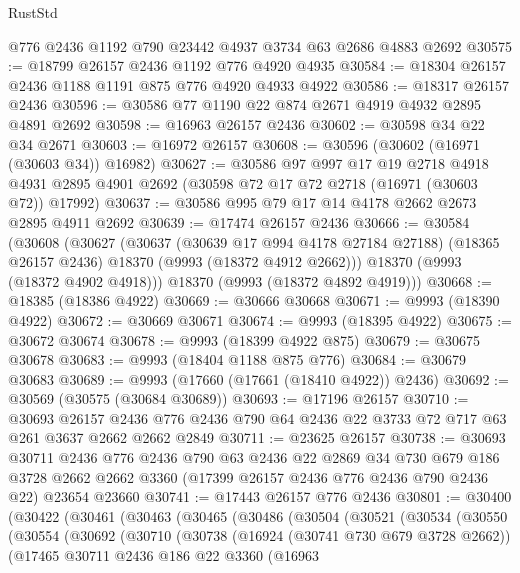\begin{lexlean}{RustStd}
\begin{coremodule}
    @776
    @2436
    @1192
    @790
    @23442
    @4937
    @3734
    @63
    @2686
    @4883
    @2692
@30575 := @18799 @26157 @2436 @1192 @776 @4920 @4935
@30584 := @18304 @26157 @2436 @1188 @1191 @875 @776 @4920 @4933 @4922
@30586 := @18317 @26157 @2436
@30596 := @30586 @77 @1190 @22 @874 @2671 @4919 @4932 @2895 @4891 @2692
@30598 := @16963 @26157 @2436
@30602 := @30598 @34 @22 @34 @2671
@30603 := @16972 @26157
@30608 := @30596 (@30602 (@16971 (@30603 @34)) @16982)
@30627 := @30586
    @97
    @997
    @17
    @19
    @2718
    @4918
    @4931
    @2895
    @4901
    @2692
    (@30598 @72 @17 @72 @2718 (@16971 (@30603 @72)) @17992)
@30637 := @30586 @995 @79 @17 @14 @4178 @2662 @2673 @2895 @4911 @2692
@30639 := @17474 @26157 @2436
@30666 := @30584
    (@30608
      (@30627
        (@30637
          (@30639 @17 @994 @4178 @27184 @27188)
          (@18365 @26157 @2436)
          @18370
          (@9993 (@18372 @4912 @2662)))
        @18370
        (@9993 (@18372 @4902 @4918)))
      @18370
      (@9993 (@18372 @4892 @4919)))
@30668 := @18385 (@18386 @4922)
@30669 := @30666 @30668
@30671 := @9993 (@18390 @4922)
@30672 := @30669 @30671
@30674 := @9993 (@18395 @4922)
@30675 := @30672 @30674
@30678 := @9993 (@18399 @4922 @875)
@30679 := @30675 @30678
@30683 := @9993 (@18404 @1188 @875 @776)
@30684 := @30679 @30683
@30689 := @9993 (@17660 (@17661 (@18410 @4922)) @2436)
@30692 := @30569 (@30575 (@30684 @30689))
@30693 := @17196 @26157
@30710 := @30693
    @26157
    @2436
    @776
    @2436
    @790
    @64
    @2436
    @22
    @3733
    @72
    @717
    @63
    @261
    @3637
    @2662
    @2662
    @2849
@30711 := @23625 @26157
@30738 := @30693
    @30711
    @2436
    @776
    @2436
    @790
    @63
    @2436
    @22
    @2869
    @34
    @730
    @679
    @186
    @3728
    @2662
    @2662
    @3360
    (@17399 @26157 @2436 @776 @2436 @790 @2436 @22)
    @23654
    @23660
@30741 := @17443 @26157 @776 @2436
@30801 := @30400
    (@30422
      (@30461
        (@30463
          (@30465
            (@30486
              (@30504
                (@30521
                  (@30534
                    (@30550
                      (@30554
                        (@30692
                          (@30710
                            (@30738
                              (@16924 (@30741 @730 @679 @3728 @2662))
                              (@17465
                                @30711
                                @2436
                                @186
                                @22
                                @3360
                                (@16963

\end{coremodule}
\end{lexlean}
